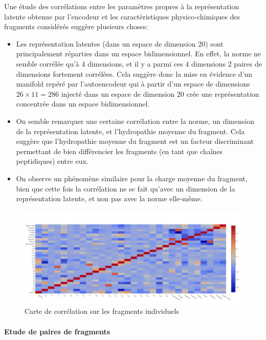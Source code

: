 \documentclass[a4paper, 11pt, onecolumn]{article}
\begin{document}
Une étude des corrélations entre les paramètres propres à la représentation
latente obtenue par l'encodeur et les caractèristiques physico-chimiques des
fragments considérés suggère plusieurs choses:
\begin{itemize}
\item Les représentation latentes (dans un espace de dimension 20) sont
  principalement réparties dans un espace bidimensionnel. En effet, la norme ne
  semble corrélée qu'à 4 dimensions, et il y a parmi ces 4 dimensions 2 paires
  de dimensions fortement corrélées. Cela suggère donc la mise en évidence d'un
  manifold repéré par l'autoencodeur qui à partir d'un espace de dimensions
  $26\times 11= 286$ injecté dans un espace de dimension 20 crée une
  représentation concentrée dans un espace bidimensionnel.
  
\item On semble remarquer une certaine corrélation entre la norme, un dimension
  de la représentation latente, et l'hydropathie moyenne du fragment. Cela
  suggère que l'hydropathie moyenne du fragment est un facteur discriminant
  permettant de bien différencier les fragments (en tant que chaînes
  peptidiques) entre eux.
\item On observe un phénomène similaire pour la charge moyenne du fragment, bien
  que cette fois la corrélation ne se fait qu'avec un dimension de la
  représentation latente, et non pas avec la norme elle-même.
\end{itemize}

\begin{figure}
  \centering
  \includegraphics[scale=1.7]{SingleOneRecHeatf}
  \caption{Carte de corrélation sur les fragments individuels}
\end{figure}

\paragraph{Etude de paires de fragments}
\end{document}
